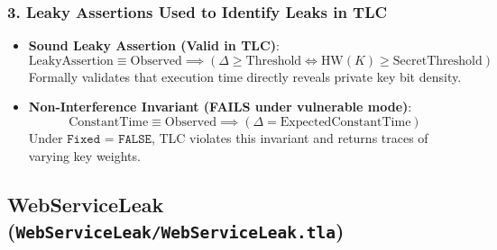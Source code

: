 \documentclass[a4paper,11pt]{article}
\begin{document}
\subsubsection{3. Leaky Assertions Used to Identify Leaks in TLC}
\begin{itemize}
    \item \textbf{Sound Leaky Assertion (Valid in TLC)}:
    $$\text{LeakyAssertion} \equiv \text{Observed} \implies (\Delta \ge \text{Threshold} \iff \text{HW}(K) \ge \text{SecretThreshold})$$
    Formally validates that execution time directly reveals private key bit density.
    \item \textbf{Non-Interference Invariant (FAILS under vulnerable mode)}:
    $$\text{ConstantTime} \equiv \text{Observed} \implies (\Delta = \text{ExpectedConstantTime})$$
    Under $\texttt{Fixed = FALSE}$, TLC violates this invariant and returns traces of varying key weights.
\end{itemize}

\bigskip

\subsection{WebServiceLeak (\texttt{WebServiceLeak/WebServiceLeak.tla})}
\end{document}
